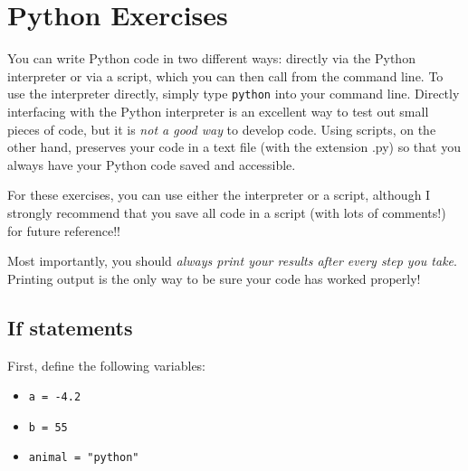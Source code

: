 \documentclass{article}[12pt]
\newcommand{\code}[1]{\texttt{#1}}  %
\begin{document}
\vspace{2.25cm}

\section{Python Exercises}

You can write Python code in two different ways: directly via the Python interpreter or via a script, which you can then call from the command line. To use the interpreter directly, simply type \code{python} into your command line. Directly interfacing with the Python interpreter is an excellent way to test out small pieces of code, but it is \emph{not a good way} to develop code. Using scripts, on the other hand, preserves your code in a text file (with the extension .py) so that you always have your Python code saved and accessible.

For these exercises, you can use either the interpreter or a script, although I strongly recommend that you save all code in a script (with lots of comments!) for future reference!!

Most importantly, you should \emph{always print your results after every step you take}. Printing output is the only way to be sure your code has worked properly!


\subsection{If statements}

First, define the following variables: 
	\begin{itemize}
        \item \code{a = -4.2}
        \item \code{b = 55}
        \item \code{animal = "python"}
    \end{itemize}
\end{document}
